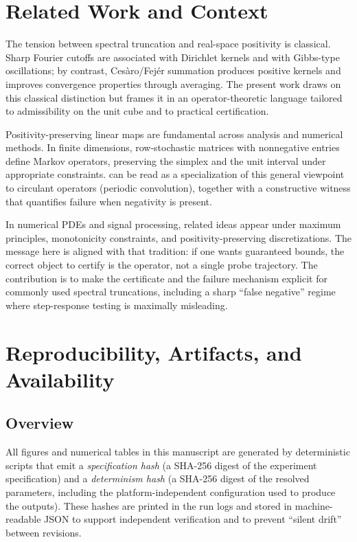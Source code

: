 \documentclass[11pt,a4paper]{article}
\theoremstyle{plain}
\theoremstyle{definition}
\theoremstyle{plain}
\begin{document}
\section{Related Work and Context}
\label{sec:related}

The tension between spectral truncation and real-space positivity is classical.
Sharp Fourier cutoffs are associated with Dirichlet kernels and with Gibbs-type
oscillations; by contrast, Ces\`aro/Fej\'er summation produces positive kernels
and improves convergence properties through averaging.  The present work draws on
this classical distinction but frames it in an operator-theoretic language
tailored to admissibility on the unit cube and to practical certification.

Positivity-preserving linear maps are fundamental across analysis and numerical
methods.  In finite dimensions, row-stochastic matrices with nonnegative entries
define Markov operators, preserving the simplex and the unit interval under
appropriate constraints.   can be read as a specialization of
this general viewpoint to circulant operators (periodic convolution), together
with a constructive witness that quantifies failure when negativity is present.

In numerical PDEs and signal processing, related ideas appear under maximum
principles, monotonicity constraints, and positivity-preserving discretizations.
The message here is aligned with that tradition: if one wants guaranteed bounds,
the correct object to certify is the operator, not a single probe trajectory.
The contribution is to make the certificate and the failure mechanism explicit for
commonly used spectral truncations, including a sharp ``false negative'' regime
where step-response testing is maximally misleading.


\section{Reproducibility, Artifacts, and Availability}
\label{sec:reproducibility}

\subsection{Overview}

All figures and numerical tables in this manuscript are generated by
deterministic scripts that emit a \emph{specification hash} (a SHA-256 digest of
the experiment specification) and a \emph{determinism hash} (a SHA-256 digest of
the resolved parameters, including the platform-independent configuration used to
produce the outputs).  These hashes are printed in the run logs and stored in
machine-readable JSON to support independent verification and to prevent ``silent
drift'' between revisions.
\end{document}
